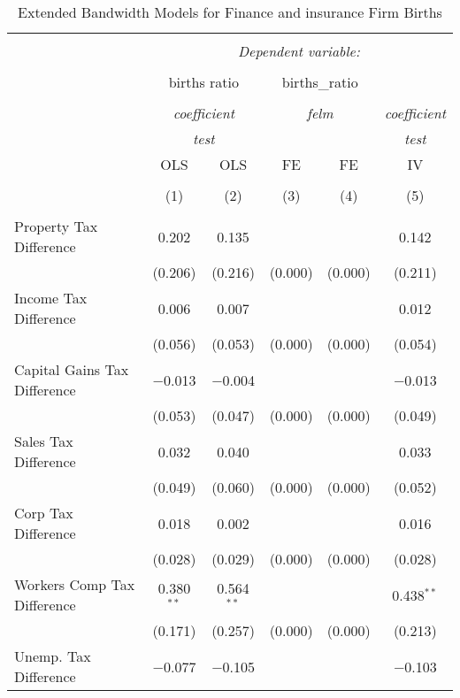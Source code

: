 
\begin{table}[!htbp] \centering 
  \caption{Extended Bandwidth Models for  Finance and insurance Firm Births} 
  \label{} 
\begin{tabular}{@{\extracolsep{5pt}}lccccc} 
\\[-1.8ex]\hline 
\hline \\[-1.8ex] 
 & \multicolumn{5}{c}{\textit{Dependent variable:}} \\ 
\cline{2-6} 
\\[-1.8ex] & \multicolumn{2}{c}{births ratio} & \multicolumn{2}{c}{births\_ratio} &   \\ 
\\[-1.8ex] & \multicolumn{2}{c}{\textit{coefficient}} & \multicolumn{2}{c}{\textit{felm}} & \textit{coefficient} \\ 
 & \multicolumn{2}{c}{\textit{test}} & \multicolumn{2}{c}{\textit{}} & \textit{test} \\ 
 & OLS & OLS & FE & FE & IV \\ 
\\[-1.8ex] & (1) & (2) & (3) & (4) & (5)\\ 
\hline \\[-1.8ex] 
 Property Tax Difference & 0.202 & 0.135 &  &  & 0.142 \\ 
  & (0.206) & (0.216) & (0.000) & (0.000) & (0.211) \\ 
  Income Tax Difference & 0.006 & 0.007 &  &  & 0.012 \\ 
  & (0.056) & (0.053) & (0.000) & (0.000) & (0.054) \\ 
  Capital Gains Tax Difference & $-$0.013 & $-$0.004 &  &  & $-$0.013 \\ 
  & (0.053) & (0.047) & (0.000) & (0.000) & (0.049) \\ 
  Sales Tax Difference & 0.032 & 0.040 &  &  & 0.033 \\ 
  & (0.049) & (0.060) & (0.000) & (0.000) & (0.052) \\ 
  Corp Tax Difference & 0.018 & 0.002 &  &  & 0.016 \\ 
  & (0.028) & (0.029) & (0.000) & (0.000) & (0.028) \\ 
  Workers Comp Tax Difference & 0.380$^{**}$ & 0.564$^{**}$ &  &  & 0.438$^{**}$ \\ 
  & (0.171) & (0.257) & (0.000) & (0.000) & (0.213) \\ 
  Unemp. Tax Difference & $-$0.077 & $-$0.105 &  &  & $-$0.103 \\ 

\end{tabular}
\end{table}
